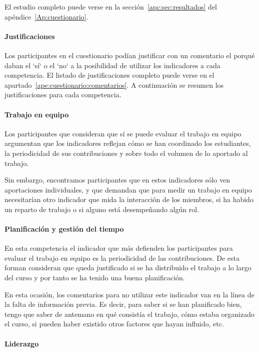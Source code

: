El estudio completo puede verse en la sección~\ref{apc:sec:resultados} del apéndice~\ref{Ap:cuestionario}.

\paragraph{Justificaciones}

Los participantes en el cuestionario podían justificar con un comentario el porqué daban el `sí` o el `no` a la posibilidad de utilizar los indicadores a cada competencia. El listado de justificaciones completo puede verse en el apartado~\ref{ape:cuestionario:comentarios}. A continuación se resumen los justificaciones para cada competencia.

\paragraph*{Trabajo en equipo}

Los participantes que consideran que sí se puede evaluar el trabajo en equipo argumentan que los indicadores reflejan cómo se han coordinado los estudiantes, la periodicidad de sus contribuciones y sobre todo el volumen de lo aportado al trabajo.

Sin embargo, encontramos participantes que en estos indicadores sólo ven aportaciones individuales, y que demandan que para medir un trabajo en equipo necesitarían otro indicador que mida la interacción de los miembros, si ha habido un reparto de trabajo o si alguno está desempeñando algún rol.

\paragraph*{Planificación y gestión del tiempo}

En esta competencia el indicador que más defienden los participantes para evaluar el trabajo en equipo es la periodicidad de las contribuciones. De esta forman consideran que queda justificado si se ha distribuido el trabajo a lo largo del curso y por tanto se ha tenido una buena planificación.

En esta ocasión, los comentarios para no utilizar este indicador van en la línea de la falta de información previa. Es decir, para saber si se han planificado bien, tengo que saber de antemano en qué consistía el trabajo, cómo estaba organizado el curso, si pueden haber existido otros factores que hayan influido, etc. 

\paragraph*{Liderazgo}

